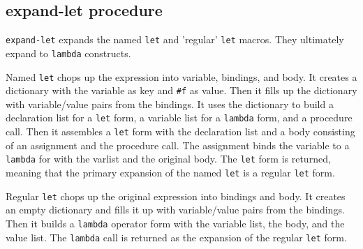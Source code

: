 \documentclass[twoside,9pt]{report}
\begin{document}
\subsection{expand-let procedure}
\label{expand-let-procedure}


\texttt{expand-let} expands the named \texttt{let} and 'regular' \texttt{let} macros. They ultimately expand to \texttt{lambda} constructs.


Named \texttt{let} chops up the expression into variable, bindings, and body. It creates a dictionary with the variable as key and \texttt{\#f} as value. Then it fills up the dictionary with variable/value pairs from the bindings. It uses the dictionary to build a declaration list for a \texttt{let} form, a variable list for a \texttt{lambda} form, and a procedure call. Then it assembles a \texttt{let} form with the declaration list and a body consisting of an assignment and the procedure call. The assignment binds the variable to a \texttt{lambda} for with the varlist and the original body. The \texttt{let} form is returned, meaning that the primary expansion of the named \texttt{let} is a regular \texttt{let} form.


Regular \texttt{let} chops up the original expression into bindings and body. It creates an empty dictionary and fills it up with variable/value pairs from the bindings. Then it builds a \texttt{lambda} operator form with the variable list, the body, and the value list. The \texttt{lambda} call is returned as the expansion of the regular \texttt{let} form.
\end{document}
